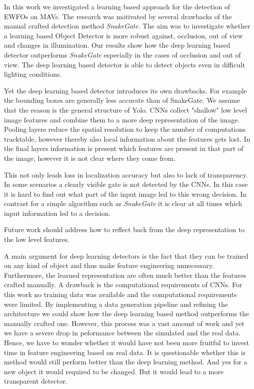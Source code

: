 In this work we investigated a learning based approach for the detection of \acp{EWFO} on \acp{MAV}. The research was motivated by several drawbacks of the manual crafted detection method \textit{SnakeGate}. The aim was to investigate whether a learning based Object Detector is more robust against, occlusion, out of view and changes in illumination. Our results show how the deep learning based detector outperforms \textit{SnakeGate} especially in the cases of occlusion and out of view. The deep learning based detector is able to detect objects even in difficult lighting conditions.

Yet the deep learning based detector introduces its own drawbacks. For example the bounding boxes are generally less accurate than of SnakeGate. We assume that the reason is the general structure of \ac{Yolo}. \acp{CNN} collect "shallow" low level image features and combine them to a more deep representation of the image. Pooling layers reduce the spatial resolution to keep the number of computations tracktable, however thereby also local information about the features gets lost. In the final layers information is present which features are present in that part of the image, however it is not clear where they come from. 

This not only leads loss in localization accuracy but also to lack of transparency. In some scenarios a clearly visible gate is not detected by the \acp{CNN}. In this case it is hard to find out what part of the input image led to this wrong decision. In contrast for a simple algorithm such as  \textit{SnakeGate} it is clear at all times which input information led to a decision.

Future work should address how to reflect back from the deep representation to the low level features.

A main argument for deep learning detectors is the fact that they can be trained on any kind of object and thus make feature engineering unnecessary. Furthermore, the learned representation are often much better than the features crafted manually. A drawback is the computational requirements of \acp{CNN}. For this work no training data was available and the computational requirements were limited. By implementing a data generation pipeline and refining the architecture we could show how the deep learning based method outperforms the manually crafted one. However, this process was a vast amount of work and yet we have a severe drop in peformance between the simulated and the real data. Hence, we have to wonder whether it would have not been more fruitful to invest time in feature engineering based on real data. It is questionable whether this is method would still perform better than the deep learning method. And yes for a new object it would required to be changed. But it would lead to a more transparent detector.
